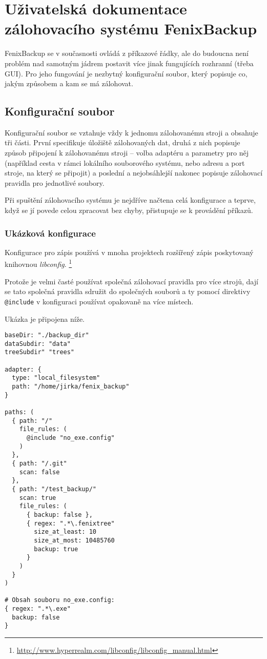 \chapter{Uživatelská dokumentace zálohovacího systému FenixBackup}

FenixBackup se v současnosti ovládá z příkazové řádky, ale do budoucna není
problém nad samotným jádrem postavit více jinak fungujících rozhranní (třeba
GUI). Pro jeho fungování je nezbytný konfigurační soubor, který popisuje co,
jakým způsobem a kam se má zálohovat.

\section{Konfigurační soubor}

Konfigurační soubor se vztahuje vždy k jednomu zálohovanému stroji a obsahuje
tři části. První specifikuje úložiště zálohovaných dat, druhá z nich popisuje
způsob připojení k zálohovanému stroji -- volba adaptéru a parametry pro něj
(například cesta v rámci lokálního souborového systému, nebo adresu a port
stroje, na který se připojit) a poslední a nejobsáhlejší nakonec popisuje
zálohovací pravidla pro jednotlivé soubory.

Při spuštění zálohovacího systému je nejdříve načtena celá konfigurace a teprve,
když se jí povede celou zpracovat bez chyby, přistupuje se k provádění příkazů.

\subsection{Ukázková konfigurace}

Konfigurace pro zápis používá v mnoha projektech rozšířený zápis poskytovaný
knihovnou {\it libconfig}.%
\footnote{\url{http://www.hyperrealm.com/libconfig/libconfig_manual.html}}

Protože je velmi časté používat společná zálohovací pravidla pro více strojů,
dají se tato společná pravidla sdružit do společných souborů a ty pomocí
direktivy \texttt{@include} v konfiguraci používat opakovaně na více místech.

Ukázka je připojena níže.

\begin{verbatim}
baseDir: "./backup_dir"
dataSubdir: "data"
treeSubdir" "trees"

adapter: {
  type: "local_filesystem"
  path: "/home/jirka/fenix_backup"
}

paths: (
  { path: "/"
    file_rules: (
      @include "no_exe.config"
    )
  },
  { path: "/.git"
    scan: false
  },
  { path: "/test_backup/"
    scan: true
    file_rules: (
      { backup: false },
      { regex: ".*\.fenixtree"
        size_at_least: 10
        size_at_most: 10485760
        backup: true
      }
    )
  }
)

# Obsah souboru no_exe.config:
{ regex: ".*\.exe"
  backup: false
}
\end{verbatim}

